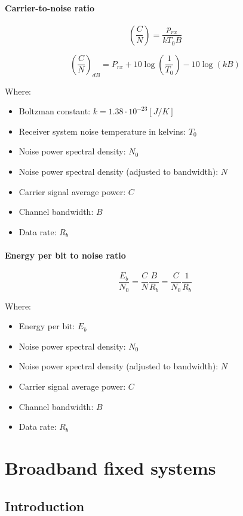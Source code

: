 \documentclass[
	12pt,
	twoside
]{book}
\begin{document}
\subsubsection{Carrier-to-noise ratio}

$$
	\left( \frac {C} {N} \right) = \frac {p_{rx}} {k T_0 B}
$$

$$
	\left( \frac {C} {N} \right)_{dB} = P_{rx} + 10 \log \left( \frac {1} {T_0} \right) - 10 \log (k B)
$$

Where:

\begin{itemize}
	\item Boltzman constant: $k = 1.38 \cdot 10^{-23} [J/K]$
	\item Receiver system noise temperature in kelvins: $T_0$
	\item Noise power spectral density: $N_0$
	\item Noise power spectral density (adjusted to bandwidth): $N$
	\item Carrier signal average power: $C$
	\item Channel bandwidth: $B$
	\item Data rate: $R_b$
\end{itemize}

\subsubsection{Energy per bit to noise ratio}

$$
	\frac {E_b} {N_0} = \frac {C} {N} \frac {B} {R_b} = \frac {C} {N_0} \frac {1} {R_b}
$$

Where:

\begin{itemize}
	\item Energy per bit: $E_b$
	\item Noise power spectral density: $N_0$
	\item Noise power spectral density (adjusted to bandwidth): $N$
	\item Carrier signal average power: $C$
	\item Channel bandwidth: $B$
	\item Data rate: $R_b$
\end{itemize}

\chapter{Broadband fixed systems}

\section{Introduction}
\end{document}
